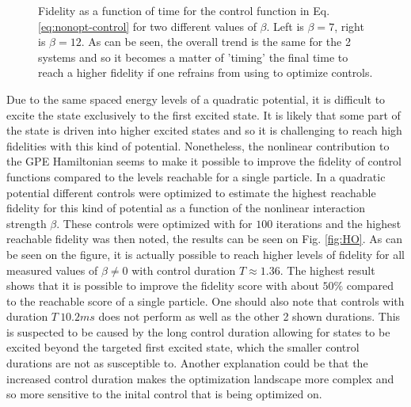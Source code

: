 \documentclass[a4paper, twocolumn]{revtex4-1}
\begin{document}
\begin{figure}
\begin{subfigure}{0.45\columnwidth}
	\end{subfigure}
	\caption{Fidelity as a function of time for the control function in Eq. \eqref{eq:nonopt-control} for two different values of $\beta$. Left is $\beta=7$, right is $\beta=12$. As can be seen, the overall trend is the same for the 2 systems and so it becomes a matter of 'timing' the final time to reach a higher fidelity if one refrains from using  to optimize controls.}
	\label{fig:fidelityplot}
\end{figure}


Due to the same spaced energy levels of a quadratic potential, it is difficult to excite the state exclusively to the first excited state. It is likely that some part of the state is driven into higher excited states and so it is challenging to reach high fidelities with this kind of potential. Nonetheless, the nonlinear contribution to the GPE Hamiltonian seems to make it possible to improve the fidelity of control functions compared to the levels reachable for a single particle. In a quadratic potential different controls were optimized to estimate the highest reachable fidelity for this kind of potential as a function of the nonlinear interaction strength $\beta$. These controls were optimized with  for $100$ iterations and the highest reachable fidelity was then noted, the results can be seen on Fig. \ref{fig:HO}. As can be seen on the figure, it is actually possible to reach higher levels of fidelity for all measured values of $\beta \neq 0$ with control duration $T\approx 1.36$. The highest result shows that it is possible to improve the fidelity score with about $50\%$ compared to the reachable score of a single particle. One should also note that controls with duration $T~10.2 ms$ does not perform as well as the other 2 shown durations. This is suspected to be caused by the long control duration allowing for states to be excited beyond the targeted first excited state, which the smaller control durations are not as susceptible to. Another explanation could be that the increased control duration makes the optimization landscape more complex and so more sensitive to the inital control that is being optimized on.
\end{document}
